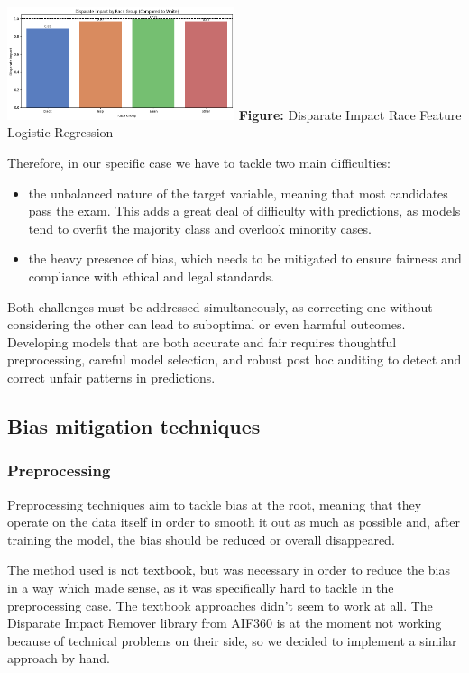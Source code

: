 \documentclass{article}
\begin{document}
\noindent
\begin{center}
  \includegraphics[width=0.5\textwidth]{racelogisticregression.png}
  \vspace{0.5em}
  \textbf{Figure:} Disparate Impact Race Feature Logistic Regression
\end{center}

Therefore, in our specific case we have to tackle two main difficulties: 
\begin{itemize}
    \item the unbalanced nature of the target variable, meaning that most candidates pass the exam. This adds a great deal of difficulty with predictions, as models tend to overfit the majority class and overlook minority cases.
    \item the heavy presence of bias, which needs to be mitigated to ensure fairness and compliance with ethical and legal standards.
\end{itemize}
Both challenges must be addressed simultaneously, as correcting one without considering the other can lead to suboptimal or even harmful outcomes. Developing models that are both accurate and fair requires thoughtful preprocessing, careful model selection, and robust post hoc auditing to detect and correct unfair patterns in predictions.


\subsection{Bias mitigation techniques}
\subsubsection{Preprocessing}
Preprocessing techniques aim to tackle bias at the root, meaning that they operate on the data itself in order to smooth it out as much as possible and, after training the model, the bias should be reduced or overall disappeared. 

The method used is not textbook, but was necessary in order to reduce the bias in a way which made sense, as it was specifically hard to tackle in the preprocessing case. The textbook approaches didn't seem to work at all. The Disparate Impact Remover library from AIF360 is at the moment not working because of technical problems on their side, so we decided to implement a similar approach by hand. 
\end{document}
